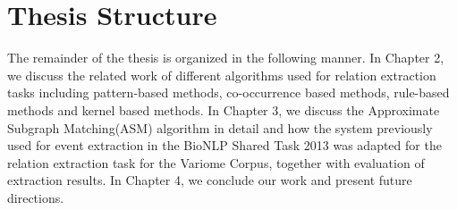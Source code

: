 \section{Thesis Structure}\label{section1.3} %
The remainder of the thesis is organized in the following manner. In Chapter 2, we discuss the related work of different algorithms used for relation extraction tasks including pattern-based methods, co-occurrence based methods, rule-based methods and kernel based methods. In Chapter 3, we discuss the Approximate Subgraph Matching(ASM) algorithm in detail and how the system previously used for event extraction in the BioNLP Shared Task 2013 was adapted for the relation extraction task for the Variome Corpus, together with evaluation of extraction results. In Chapter 4, we conclude our work and present future directions.


